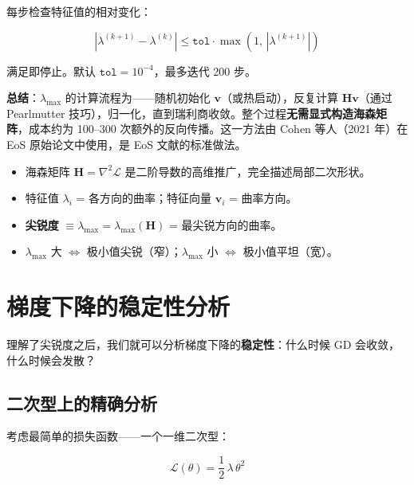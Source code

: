\documentclass[11pt,a4paper]{ctexart}
\newcommand{\lmax}{\lambda_{\max}}
\newcommand{\Loss}{\mathcal{L}}
\newcommand{\Hmat}{\mathbf{H}}
\begin{document}
每步检查特征值的相对变化：

\begin{equation}
  |\lambda^{(k+1)} - \lambda^{(k)}| \leq \texttt{tol} \cdot \max(1,\, |\lambda^{(k+1)}|)
\end{equation}

满足即停止。默认 $\texttt{tol}=10^{-4}$，最多迭代 200 步。

\begin{notebox}
\textbf{总结}：$\lmax$ 的计算流程为——随机初始化 $\mathbf{v}$（或热启动），反复计算 $\Hmat\mathbf{v}$（通过 Pearlmutter 技巧），归一化，直到瑞利商收敛。整个过程\textbf{无需显式构造海森矩阵}，成本约为 100--300 次额外的反向传播。这一方法由 Cohen 等人（2021 年）在 EoS 原始论文中使用，是 EoS 文献的标准做法。
\end{notebox}


\begin{secnote}
\begin{itemize}[leftmargin=1.5em, itemsep=2pt]
  \item 海森矩阵 $\Hmat = \nabla^2\Loss$ 是二阶导数的高维推广，完全描述局部二次形状。
  \item 特征值 $\lambda_i$ = 各方向的曲率；特征向量 $\mathbf{v}_i$ = 曲率方向。
  \item \textbf{尖锐度} $\equiv \lmax = \lambda_{\max}(\Hmat)$ = 最尖锐方向的曲率。
  \item $\lmax$ 大 $\Leftrightarrow$ 极小值尖锐（窄）；$\lmax$ 小 $\Leftrightarrow$ 极小值平坦（宽）。
\end{itemize}
\end{secnote}

\section{梯度下降的稳定性分析}\label{sec:stability}

理解了尖锐度之后，我们就可以分析梯度下降的\textbf{稳定性}：什么时候 GD 会收敛，什么时候会发散？

\subsection{二次型上的精确分析}

考虑最简单的损失函数——一个一维二次型：

\begin{equation}\label{eq:quad1d}
  \Loss(\theta) = \frac{1}{2}\,\lambda\,\theta^2
\end{equation}
\end{document}
